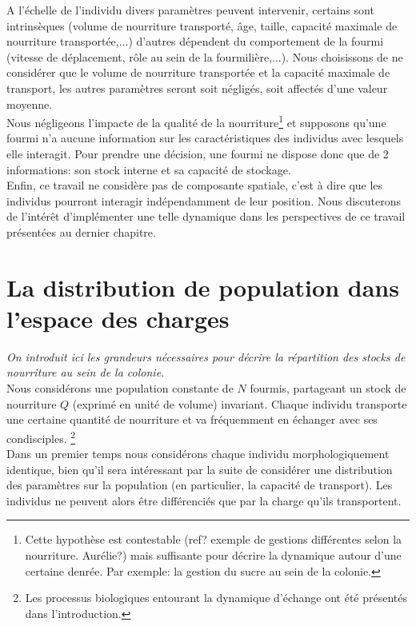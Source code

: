A l'échelle de l'individu divers paramètres peuvent intervenir, certains sont intrinsèques (volume de nourriture transporté, âge, taille, capacité maximale de nourriture transportée,...) d'autres dépendent du comportement de la fourmi (vitesse de déplacement, rôle au sein de la fourmilière,...). Nous choisissons de ne considérer que le volume de nourriture transportée et la capacité maximale de transport, les autres paramètres seront soit négligés, soit affectés d'une valeur moyenne.\\

Nous négligeons l'impacte de la qualité de la nourriture\footnote{Cette hypothèse est contestable (ref? exemple de gestions différentes selon la nourriture. Aurélie?) mais suffisante pour décrire la dynamique autour d'une certaine denrée. Par exemple: la gestion du sucre au sein de la colonie.} et supposons qu'une fourmi n'a aucune information sur les caractéristiques des individus avec lesquels elle interagit. Pour prendre une décision, une fourmi ne dispose donc que de 2 informations: son stock interne et sa capacité de stockage.\\

Enfin, ce travail ne considère pas de composante spatiale, c'est à dire que les individus pourront interagir indépendamment de leur position. Nous discuterons de l'intérêt d'implémenter une telle dynamique dans les perspectives de ce travail présentées au dernier chapitre.


\section{La distribution de population dans l'espace des charges}

\textit{On introduit ici les grandeurs nécessaires pour décrire la répartition des stocks de nourriture au sein de la colonie.}\\

Nous considérons une population constante de $N$ fourmis, partageant un stock de nourriture $Q$ (exprimé en unité de volume) invariant. Chaque individu transporte une certaine quantité de nourriture  et va fréquemment en échanger avec ses condisciples. \footnote{Les processus biologiques entourant la dynamique d'échange ont été présentés dans l'introduction.} \\

Dans un premier temps nous considérons chaque individu morphologiquement identique, bien qu'il sera intéressant par la suite de considérer une distribution des paramètres sur la population (en particulier, la capacité de transport). Les individus ne peuvent alors être différenciés que par la charge qu'ils transportent.\\

